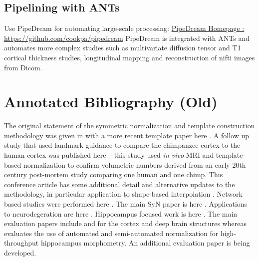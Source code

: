 \documentclass{InsightArticle}
\begin{document}
\subsection{Pipelining with ANTs}
Use PipeDream for automating large-scale processing:\newline
\href{https://github.com/cookpa/pipedream}{PipeDream
  Homepage :
  https://github.com/cookpa/pipedream} \newline PipeDream
is integrated with ANTs and automates more complex studies such as
multivariate diffusion tensor and T1 cortical thickness studies,
longitudinal mapping and reconstruction of nifti images from Dicom.
\newpage
\section{Annotated Bibliography (Old)}
The original statement of the symmetric normalization and template
construction methodology was given in \cite{Avants2004} with a more 
recent template paper here \cite{Avants2009c}. 
A follow up study that used landmark guidance to compare the chimpanzee cortex to
the human cortex was published here \cite{Avants2006} -- this study
used {\em in vivo} MRI and template-based normalization to confirm
volumetric numbers derived from an early 20th century post-mortem
study comparing one human and one chimp.  This conference article has
some additional detail and alternative updates to the methodology, in
particular application to shape-based interpolation
\cite{Avants2005b}.  Network based studies were performed here
\cite{duda08miccai,duda08cvpr}.  The main SyN paper is here
\cite{Avants2008}.  Applications to neurodegeration are here
\cite{Avants2005,Avants2008a,Grossman2008,Avants2009,Das2009,Yushkevich2009,Massimo2009}.
Hippocampus focused work is here \cite{Pluta2009,Yushkevich2009}.  The
main evaluation papers include \cite{Avants2008} and \cite{Klein2009}
for the cortex and deep brain structures whereas \cite{Pluta2009}
evaluates the use of automated and semi-automated normalization for
high-throughput hippocampus morphometry.  An additional evaluation
paper is being developed.  


%
%



\end{document}

